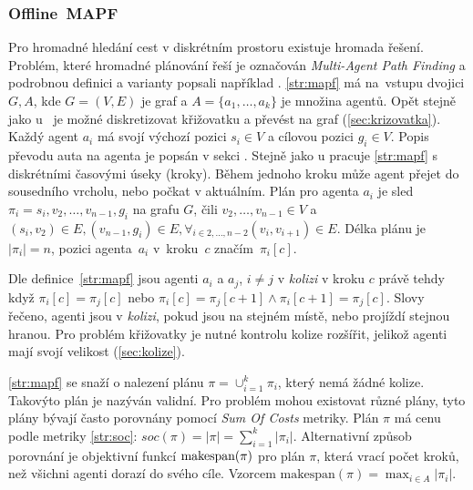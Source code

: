 \subsubsection{Offline~MAPF}\label{subsubsec:offline_mapf}

%

Pro hromadné hledání cest v diskrétním prostoru existuje hromada řešení.
Problém, které hromadné plánování řeší je označován \emph{Multi-Agent Path Finding} 
a podrobnou definici a varianty popsali například \citet*{osti_10114869}.
\ref{str:mapf} má na~vstupu dvojici $G, A$, kde $G=(V, E)$ je graf a $A = \{a_1, \dots, a_k\}$ je množina agentů.
Opět stejně jako u~ je možné diskretizovat křižovatku a převést na graf (\ref{sec:krizovatka}).
Každý agent $a_i$ má svojí výchozí pozici $s_i \in V$ a cílovou pozici $g_i \in V$.
Popis převodu auta na agenta je popsán v sekci .
Stejně jako u  pracuje \ref{str:mapf} s diskrétními časovými úseky (kroky).
Během jednoho kroku může agent přejet do sousedního vrcholu, nebo počkat v aktuálním.
Plán pro agenta $a_i$ je sled $\pi_i = s_i, v_2, \dots, v_{n-1}, g_i$ na grafu $G$, čili $v_2, \dots, v_{n-1} \in V$ a
$(s_i, v_2) \in E, (v_{n-1}, g_i) \in E, \forall_{i \in 2, \dots, n-2} (v_i, v_{i+1}) \in E$.
Délka plánu je $|\pi_i| = n$, pozici agenta~$a_i$ v~kroku~$c$ značím~$\pi_i[c]$.

Dle definice~\ref{str:mapf} jsou agenti $a_i$ a $a_j$, $i \neq j$ v \emph{kolizi} v kroku $c$ právě tehdy když $\pi_i[c] = \pi_j[c]$ nebo
$\pi_i[c] = \pi_j[c + 1] \land \pi_i[c + 1] = \pi_j[c]$.
Slovy řečeno, agenti jsou v \emph{kolizi}, pokud jsou na stejném místě, nebo projíždí stejnou hranou.
Pro problém křižovatky je nutné kontrolu kolize rozšířit, jelikož agenti mají svojí velikost (\ref{sec:kolize}).

\ref{str:mapf} se snaží o nalezení plánu $\pi = \cup_{i=1}^{k} \pi_i$, který nemá žádné kolize.
Takovýto plán je nazýván validní.
Pro problém mohou existovat různé plány, tyto plány bývají často porovnány pomocí \emph{Sum Of Costs}  metriky.
Plán $\pi$ má cenu podle metriky \ref{str:soc}: $soc(\pi) = |\pi| = \sum_{i=1}^{k} |\pi_i|$.
Alternativní způsob porovnání je objektivní funkcí $\textrm{makespan}\labeltext{makespan}{str:makespan}(\pi)$ pro plán $\pi$,
která vrací počet kroků, než všichni agenti dorazí do svého cíle.
Vzorcem $\textrm{makespan}(\pi)=\max_{i\in A} |\pi_i|$.

